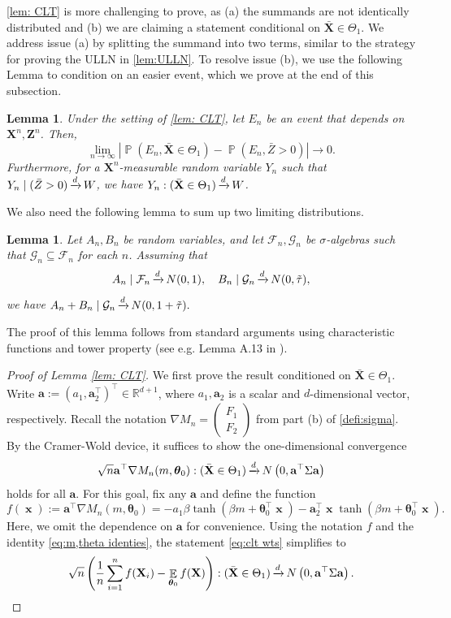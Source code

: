 \documentclass[preprint,reqno]{imsart}
\newtheorem{lemma}[thm]{Lemma}
\newcommand{\ttheta}{\boldsymbol{\theta}}
\DeclareMathOperator{\bx}{\textbf{x}}
\DeclareMathOperator{\xd}{\xrightarrow{\mathnormal d}}
\DeclareMathOperator{\EE}{\mathbb{E}}
\DeclareMathOperator{\PP}{\mathbb{P}}
\newcommand{\Z}{\mathbf{Z}}
\newcommand{\X}{\mathbf{X}}
\DeclareMathOperator{\sumin}{\sum_{\mathnormal i=1}^{\mathnormal n}}
\begin{document}
\begin{appendix}
\cref{lem: CLT} is more challenging to prove, as (a) the summands are not identically distributed and (b) we are claiming a statement conditional on $\bar{\X} \in \Theta_1$. We address issue (a) by splitting the summand into two terms, similar to the strategy for proving the ULLN in \cref{lem:ULLN}.
To resolve issue (b), we use the following Lemma to condition on an easier event, which we prove at the end of this subsection.
\begin{lemma}\label{lem:X > 0, Z > 0}
    Under the setting of \cref{lem: CLT}, let $E_n$ be an event that depends on $\X^n, \Z^n$. Then, $$\lim_{n \to \infty} |\PP(E_n, \bar{\X} \in \Theta_1) - \PP(E_n, \bar{Z}>0)| \to 0.$$ 
    Furthermore, for a $\X^n$-measurable random variable $Y_n$ such that $Y_n \mid (\bar{Z} > 0) \xd W$, we have $Y_n : (\bar{\X} \in \Theta_1) \xd W$.
\end{lemma}
We also need the following lemma to sum up two limiting distributions.
\begin{lemma}\label{lem:converging together}
    Let $A_n, B_n$ be random variables, and let $\mathcal{F}_n, \mathcal{G}_n$ be $\sigma$-algebras such that $\mathcal{G}_n \subseteq \mathcal{F}_n$ for each $n$. Assuming that
    $$A_n \mid \mathcal{F}_n \xd N(0, 1), \quad B_n \mid \mathcal{G}_n \xd N(0, \tilde{\tau}),$$
    we have $A_n + B_n \mid \mathcal{G}_n \xd N(0, 1+\tilde{\tau}).$
\end{lemma}
\noindent The proof of this lemma follows from standard arguments using characteristic functions and tower property (see e.g. Lemma A.13 in \cite{lee2025clt}).

\begin{proof}[Proof of Lemma \ref{lem: CLT}]
 We first prove the result conditioned on $\bar{\X} \in \Theta_1$. Write $\mathbf{a} := (a_1, \mathbf{a}_2^\top)^\top \in \mathbb{R}^{d+1}$, where $a_1, \mathbf{a}_2$ is a scalar and $d$-dimensional vector, respectively. Recall the notation $\nabla M_n = \begin{pmatrix}
     F_1 \\ F_2
 \end{pmatrix}$ from part (b) of \cref{defi:sigma}.
 By the Cramer-Wold device, it suffices to show the one-dimensional convergence
 \begin{align}\label{eq:clt wts}
     \sqrt{n} \mathbf{a}^\top \nabla M_n(m, \ttheta_0) : (\bar{\X} \in \Theta_1) \xd N\left(0, \mathbf{a}^\top \Sigma \mathbf{a} \right)
 \end{align}
 holds for all $\mathbf{a}$. For this goal, fix any $ \mathbf{a}$ and define the function $$f(\bx) := \mathbf{a}^\top \nabla M_n(m, \ttheta_0) =  - a_1 \beta \tanh(\beta m + \ttheta_0^\top \bx) - \mathbf{a}_2^\top \bx \tanh(\beta m + \ttheta_0^\top \bx).$$
 Here, we omit the dependence on $\mathbf{a}$ for convenience.
 Using the notation $f$ and the identity \eqref{eq:m,theta identies}, the statement \eqref{eq:clt wts} simplifies to
 \begin{align}\label{eq:clt wts simplified}
     \sqrt{n} \left(\frac{1}{n} \sumin f(\X_i) - \EE_{\ttheta_0} f(\X) \right) : (\bar{\X} \in \Theta_1) \xd N \left(0, \mathbf{a}^\top \Sigma \mathbf{a} \right).
 \end{align}


\end{proof}
\end{appendix}
\end{document}
